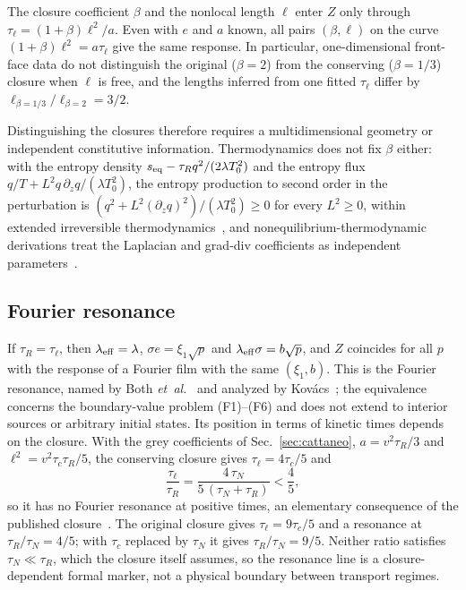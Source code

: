 \begin{corollary}\label{cor:beta}
The closure coefficient $\beta$ and the nonlocal length $\ell$ enter $Z$ only through
$\tau_\ell=(1+\beta)\ell^2/a$. Even with $e$ and $a$ known, all pairs $(\beta,\ell)$ on the curve
$(1+\beta)\ell^2=a\tau_\ell$ give the same response. In particular, one-dimensional front-face data do
not distinguish the original ($\beta=2$) from the conserving ($\beta=1/3$) closure when $\ell$ is free,
and the lengths inferred from one fitted $\tau_\ell$ differ by $\ell_{\beta=1/3}/\ell_{\beta=2}=3/2$.
\end{corollary}

Distinguishing the closures therefore requires a multidimensional geometry or independent constitutive
information. Thermodynamics does not fix $\beta$ either: with the entropy density
$s_{\rm eq}-\tau_Rq^2/(2\lambda T_0^2)$ and the entropy flux $q/T+L^2q\,\partial_zq/(\lambda T_0^2)$, the
entropy production to second order in the perturbation is $(q^2+L^2(\partial_zq)^2)/(\lambda T_0^2)\ge0$
for every $L^2\ge0$, within extended irreversible thermodynamics~\cite{JouCasasLebon2010}, and
nonequilibrium-thermodynamic derivations treat the Laplacian and grad-div coefficients as independent
parameters~\cite{Kovacs2024}.

\subsection{Fourier resonance}\label{sec:resonance}

If $\tau_R=\tau_\ell$, then $\lambda_{\rm eff}=\lambda$, $\sigma e=\xi_1\sqrt p$ and
$\lambda_{\rm eff}\sigma=b\sqrt p$, and $Z$ coincides for all $p$ with the response of a Fourier film with
the same $(\xi_1,b)$. This is the Fourier resonance, named by Both \emph{et~al.}~\cite{Both2016} and
analyzed by Kov\'acs~\cite{Kovacs2018}; the equivalence concerns the boundary-value problem
(F1)--(F6) and does not extend to interior sources or arbitrary initial states. Its position in terms of
kinetic times depends on the closure. With the grey coefficients of Sec.~\ref{sec:cattaneo},
$a=v^2\tau_R/3$ and $\ell^2=v^2\tau_c\tau_R/5$, the conserving closure gives $\tau_\ell=4\tau_c/5$ and
\begin{equation}
\frac{\tau_\ell}{\tau_R}=\frac{4\,\tau_N}{5\,(\tau_N+\tau_R)}<\frac45 ,
\label{eq:noresonance}
\end{equation}
so it has no Fourier resonance at positive times, an elementary consequence of the published
closure~\cite{GuoWang2022}. The original closure gives $\tau_\ell=9\tau_c/5$ and a resonance at
$\tau_R/\tau_N=4/5$; with $\tau_c$ replaced by $\tau_N$ it gives $\tau_R/\tau_N=9/5$. Neither ratio
satisfies $\tau_N\ll\tau_R$, which the closure itself assumes, so the resonance line is a
closure-dependent formal marker, not a physical boundary between transport regimes.

